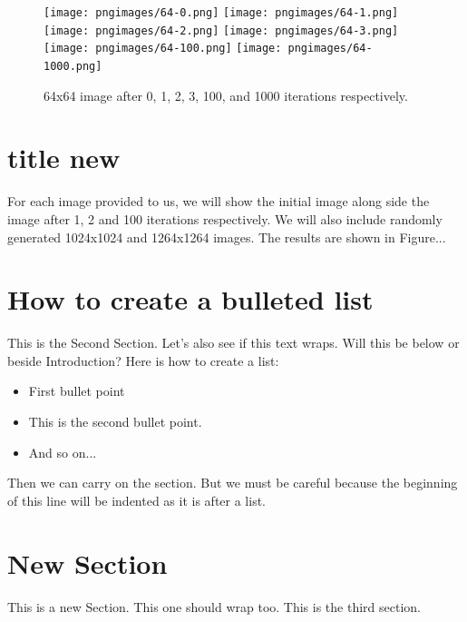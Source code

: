 \documentclass{article}
\begin{document}
\begin{figure}[H]
\centering
\texttt{[image: pngimages/64-0.png]}
\texttt{[image: pngimages/64-1.png]}
\texttt{[image: pngimages/64-2.png]}
\texttt{[image: pngimages/64-3.png]}
\texttt{[image: pngimages/64-100.png]}
\texttt{[image: pngimages/64-1000.png]}
\caption{64x64 image after 0, 1, 2, 3, 100, and 1000 iterations respectively.}
\end{figure}

\section{title new}
For each image provided to us, we will show the initial image along side the image after 1, 2 and 100
iterations respectively. We will also include randomly generated 1024x1024 and 1264x1264 images. The
results are shown in Figure...


\section{How to create a bulleted list}
This is the Second Section. Let's also see if this text wraps. Will this be below or beside Introduction? Here is how to create a list:

\begin{itemize}
\item First bullet point
\item This is the second bullet point.
\item And so on...
\end{itemize}

Then we can carry on the section. But we must be careful because the beginning of this line will be indented as it is after a list.


\section{New Section}
This is a new Section. This one should wrap too. This is the third section.


\end{document}
